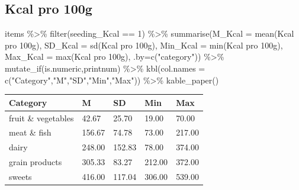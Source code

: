 \documentclass[
  letterpaper,
  DIV=11,
  numbers=noendperiod]{scrartcl}
\newenvironment{Shaded}{\begin{snugshade}}{\end{snugshade}}
\newcommand{\AttributeTok}[1]{\textcolor[rgb]{0.40,0.45,0.13}{#1}}
\newcommand{\DecValTok}[1]{\textcolor[rgb]{0.68,0.00,0.00}{#1}}
\newcommand{\FunctionTok}[1]{\textcolor[rgb]{0.28,0.35,0.67}{#1}}
\newcommand{\NormalTok}[1]{\textcolor[rgb]{0.00,0.23,0.31}{#1}}
\newcommand{\SpecialCharTok}[1]{\textcolor[rgb]{0.37,0.37,0.37}{#1}}
\newcommand{\StringTok}[1]{\textcolor[rgb]{0.13,0.47,0.30}{#1}}
\begin{document}
\subsection{Kcal pro 100g}

\begin{Shaded}
\begin{Highlighting}[]
\NormalTok{items }\SpecialCharTok{\%\textgreater{}\%}
  \FunctionTok{filter}\NormalTok{(seeding\_Kcal }\SpecialCharTok{==} \DecValTok{1}\NormalTok{) }\SpecialCharTok{\%\textgreater{}\%} 
  \FunctionTok{summarise}\NormalTok{(}\AttributeTok{M\_Kcal   =} \FunctionTok{mean}\NormalTok{(}\StringTok{\textasciigrave{}}\AttributeTok{Kcal pro 100g}\StringTok{\textasciigrave{}}\NormalTok{),}
            \AttributeTok{SD\_Kcal  =} \FunctionTok{sd}\NormalTok{(}\StringTok{\textasciigrave{}}\AttributeTok{Kcal pro 100g}\StringTok{\textasciigrave{}}\NormalTok{),}
            \AttributeTok{Min\_Kcal =} \FunctionTok{min}\NormalTok{(}\StringTok{\textasciigrave{}}\AttributeTok{Kcal pro 100g}\StringTok{\textasciigrave{}}\NormalTok{),}
            \AttributeTok{Max\_Kcal =} \FunctionTok{max}\NormalTok{(}\StringTok{\textasciigrave{}}\AttributeTok{Kcal pro 100g}\StringTok{\textasciigrave{}}\NormalTok{),}
            \AttributeTok{.by=}\FunctionTok{c}\NormalTok{(}\StringTok{"category"}\NormalTok{)) }\SpecialCharTok{\%\textgreater{}\%}
  \FunctionTok{mutate\_if}\NormalTok{(is.numeric,printnum) }\SpecialCharTok{\%\textgreater{}\%} 
  \FunctionTok{kbl}\NormalTok{(}\AttributeTok{col.names =} \FunctionTok{c}\NormalTok{(}\StringTok{"Category"}\NormalTok{,}\StringTok{"M"}\NormalTok{,}\StringTok{"SD"}\NormalTok{,}\StringTok{"Min"}\NormalTok{,}\StringTok{"Max"}\NormalTok{))   }\SpecialCharTok{\%\textgreater{}\%} 
  \FunctionTok{kable\_paper}\NormalTok{() }
\end{Highlighting}
\end{Shaded}

\begin{table}
\centering
\begin{tabular}[t]{l|l|l|l|l}
\hline
Category & M & SD & Min & Max\\
\hline
fruit \& vegetables & 42.67 & 25.70 & 19.00 & 70.00\\
\hline
meat \& fish & 156.67 & 74.78 & 73.00 & 217.00\\
\hline
dairy & 248.00 & 152.83 & 78.00 & 374.00\\
\hline
grain products & 305.33 & 83.27 & 212.00 & 372.00\\
\hline
sweets & 416.00 & 117.04 & 306.00 & 539.00\\
\hline
\end{tabular}
\end{table}
\end{document}
